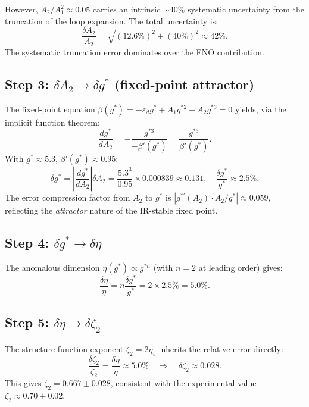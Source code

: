 However, $A_2/A_1^2 \approx 0.05$ carries an intrinsic $\sim 40\%$ systematic uncertainty from the truncation of the loop expansion. The total uncertainty is:
\begin{equation}
\frac{\delta A_2}{A_2} = \sqrt{(12.6\%)^2 + (40\%)^2} \approx 42\%.
\end{equation}
The systematic truncation error dominates over the FNO contribution.

\subsection{Step 3: $\delta A_2 \to \delta g^*$ (fixed-point attractor)}

The fixed-point equation $\beta(g^*) = -\varepsilon_d g^* + A_1 g^{*2} - A_2 g^{*3} = 0$ yields, via the implicit function theorem:
\begin{equation}
\frac{dg^*}{dA_2} = -\frac{g^{*3}}{-\beta'(g^*)} = \frac{g^{*3}}{\beta'(g^*)}.
\end{equation}
With $g^* \approx 5.3$, $\beta'(g^*) \approx 0.95$:
\begin{equation}
\delta g^* = \left|\frac{dg^*}{dA_2}\right|\delta A_2 = \frac{5.3^3}{0.95}\times 0.000839 \approx 0.131, \quad \frac{\delta g^*}{g^*} \approx 2.5\%.
\end{equation}
The error compression factor from $A_2$ to $g^*$ is $|g^{*\prime}(A_2)\cdot A_2/g^*| \approx 0.059$, reflecting the \emph{attractor} nature of the IR-stable fixed point.

\subsection{Step 4: $\delta g^* \to \delta\eta$}

The anomalous dimension $\eta(g^*) \propto g^{*n}$ (with $n=2$ at leading order) gives:
\begin{equation}
\frac{\delta\eta}{\eta} = n\frac{\delta g^*}{g^*} = 2\times 2.5\% = 5.0\%.
\end{equation}

\subsection{Step 5: $\delta\eta \to \delta\zeta_2$}

The structure function exponent $\zeta_2 = 2\eta_v$ inherits the relative error directly:
\begin{equation}
\frac{\delta\zeta_2}{\zeta_2} = \frac{\delta\eta}{\eta} \approx 5.0\% \quad\Rightarrow\quad \delta\zeta_2 \approx 0.028.
\end{equation}
This gives $\zeta_2 = 0.667 \pm 0.028$, consistent with the experimental value $\zeta_2 \approx 0.70 \pm 0.02$.


